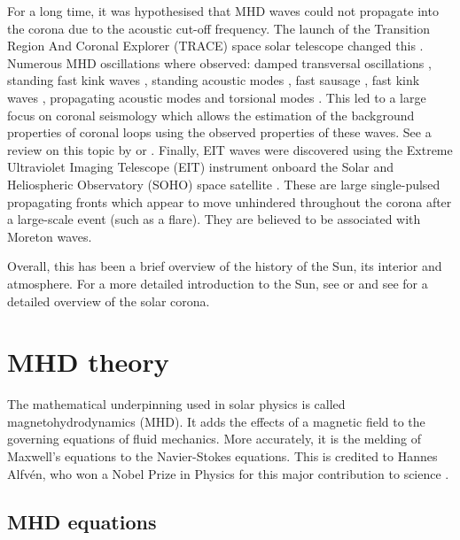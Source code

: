     For a long time, it was hypothesised that MHD waves could not propagate into the corona due to the acoustic cut-off frequency.
    The launch of the Transition Region And Coronal Explorer (TRACE) space solar telescope changed this \citep{TRACE,TRACE1}.
    Numerous MHD oscillations where observed: damped transversal oscillations \citep{8007,2002A&A...394L..39G}, standing fast kink waves \citep{1999ApJ520880A,1999Sci...285..862N,1999SoPh..187..261S}, standing acoustic modes \citep{2003A&A...406.1105W}, fast sausage \citep{2001MNRAS.326..428W,2002MNRAS.336..747W,2003A&A...406..709K}, fast kink waves \citep{2005A&A...430L..65V}, propagating acoustic modes \citep{1997ApJ...491L.111O,2000A&A...355L..23D,2002A&A...393..649M} and torsional modes \citep{1998A&A...337..287E}. 
    This led to a large focus on coronal seismology which allows the estimation of the background properties of coronal loops using the observed properties of these waves.
    See a review on this topic by \cite{lrsp-2005-3} or \cite{MHDOS}.
    Finally, EIT waves were discovered using the Extreme Ultraviolet Imaging Telescope (EIT) instrument onboard the Solar and Heliospheric Observatory (SOHO) space satellite \citep{1998GeoRL..25.2465T}.
    These are large single-pulsed propagating fronts which appear to move unhindered throughout the corona after a large-scale event (such as a flare).
    They are believed to be associated with Moreton waves.
        
    Overall, this has been a brief overview of the history of the Sun, its interior and atmosphere. 
    For a more detailed introduction to the Sun, see \cite{priest1984solar} or \cite{2014masu.book.....P} and see \cite{markus2004physics} for a detailed overview of the solar corona.
    
\section{MHD theory}

    The mathematical underpinning used in solar physics is called magnetohydrodynamics (MHD).
    It adds the effects of a magnetic field to the governing equations of fluid mechanics. 
    More accurately, it is the melding of Maxwell's equations to the Navier-Stokes equations.
    This is credited to Hannes Alfv\'en, who won a Nobel Prize in Physics for this major contribution to science \citep{1942Natur.150..405A,erdelyi2007}.

\subsection{MHD equations}


